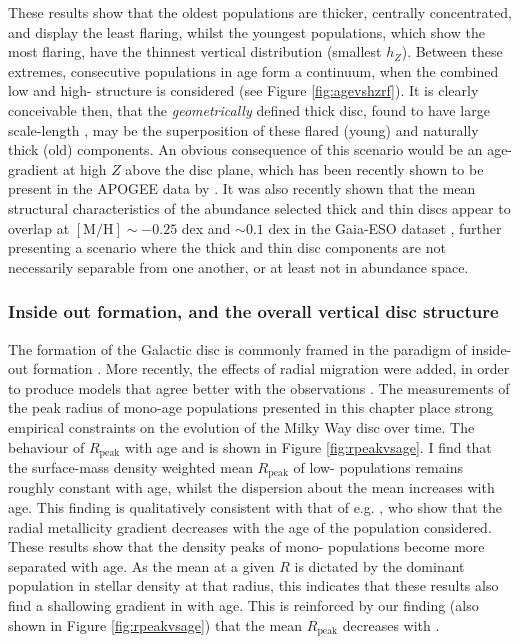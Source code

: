 These results show that the oldest populations are thicker, centrally concentrated, and display the least flaring, whilst the youngest populations, which show the most flaring, have the thinnest vertical distribution (smallest $h_Z$). Between these extremes, consecutive populations in age form a continuum, when the combined low and high-\afe{} structure is considered (see Figure \ref{fig:agevshzrf}). It is clearly conceivable then, that the \emph{geometrically} defined thick disc, found to have large scale-length \citep[e.g.,][]{2013MNRAS.431..930J,2008ApJ...673..864J}, may be the superposition of these flared (young) and naturally thick (old) components. An obvious consequence of this scenario would be an age-gradient at high $Z$ above the disc plane, which has been recently shown to be present in the APOGEE data by \citet{2016arXiv160901168M}. It was also recently shown that the mean structural characteristics of the abundance selected thick and thin discs appear to overlap at $\mathrm{[M/H]}\sim-0.25$ dex and \afe{} $\sim 0.1$ dex in the Gaia-ESO dataset \citep{2014A&A...567A...5R}, further presenting a scenario where the thick and thin disc components are not necessarily separable from one another, or at least not in abundance space. 

\subsubsection{Inside out formation, and the overall vertical disc structure}
The formation of the Galactic disc is commonly framed in the paradigm of inside-out formation \citep[e.g.,][]{2013ApJ...773...43B,2011ApJ...729...16K,1976MNRAS.176...31L,1989MNRAS.239..885M}. More recently, the effects of radial migration  \citep[e.g.][]{2002MNRAS.336..785S} were added, in order to produce models that agree better with the observations \citep[e.g.][]{2011ApJ...737....8L,2009MNRAS.396..203S,2015ApJ...802..129S,2015A&A...580A.126K} . The measurements of the peak radius of mono-age populations  presented in this chapter place strong empirical constraints on the evolution of the Milky Way disc over time. The behaviour of $R_{\mathrm{peak}}$ with age and \feh{} is shown in Figure \ref{fig:rpeakvsage}. I find that the surface-mass density weighted mean $R_{\mathrm{peak}}$ of low-\afe{} populations remains roughly constant with age, whilst the dispersion about the mean increases with age. This finding is qualitatively consistent with that of e.g. \citet{2016arXiv160804951A}, who show that the radial metallicity gradient decreases with the age of the population considered. These results show that the density peaks of mono-\feh{} populations become more separated with age. As the mean \feh{} at a given $R$ is dictated by the dominant population in stellar density at that radius, this indicates that these results also find a shallowing gradient in \feh{} with age. This is reinforced by our finding (also shown in Figure \ref{fig:rpeakvsage}) that the mean $R_{\mathrm{peak}}$ decreases with \feh{}.

